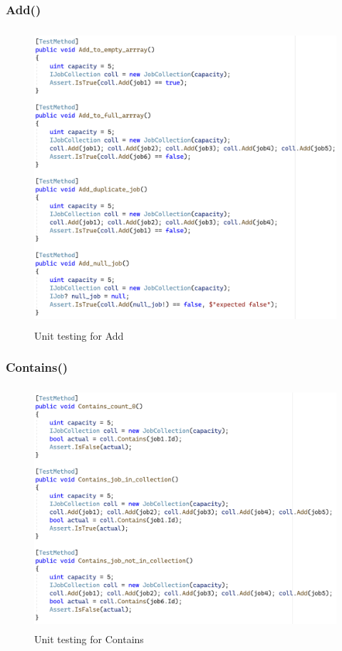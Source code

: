 \documentclass[a4paper]{article}
\begin{document}
\subsubsection{Add{()}}
\begin{figure}[H]
   \includegraphics[height=11cm]{images/Add.png}
   \caption{Unit testing for Add}
\end{figure}

\subsubsection{Contains{()}}
\begin{figure}[H]
   \includegraphics[height=9cm]{images/Contains.png}
   \caption{Unit testing for Contains}
\end{figure}
\end{document}
